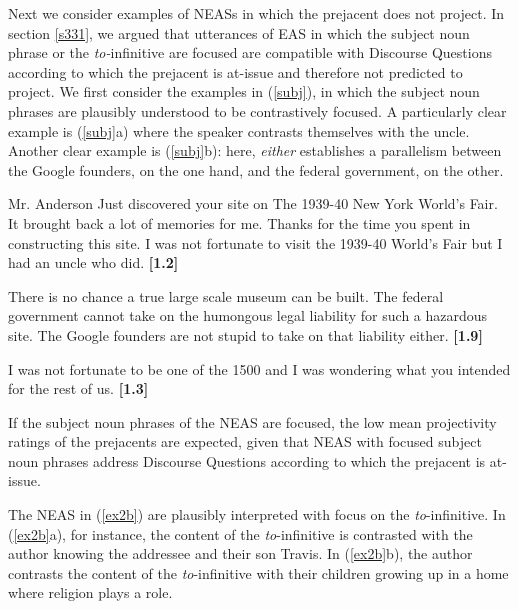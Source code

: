 \documentclass[11pt,fleqn]{article}
\newcommand{\6}{\mbox{$[\hspace*{-.6mm}[$}}
\newcommand{\9}{\mbox{$]\hspace*{-.6mm}]$}}
\begin{document}
Next we consider examples of NEASs in which the prejacent does not project. In section \ref{s331}, we argued that utterances of EAS in which the subject noun phrase or the {\em to-}infinitive are focused are compatible with Discourse Questions according to which the prejacent is at-issue and therefore not predicted to project. We first consider the examples in (\ref{subj}), in which the subject noun phrases are plausibly understood to be contrastively focused. A particularly clear example is (\ref{subj}a) where the speaker contrasts themselves with the uncle. Another clear example is (\ref{subj}b): here, {\em either} establishes a parallelism between the Google founders, on the one hand, and the federal government, on the other.


\begin{exe} 

\ex\label{subj}

\begin{xlist}

\ex Mr. Anderson Just discovered your site on
The 1939-40 New York World's Fair. It brought back a lot of memories for
me. Thanks for the time you spent in constructing this site. I was not
fortunate to visit the 1939-40 World's Fair but I had an uncle who did. \hfill {\bf [1.2]}


\ex There is no chance a true large scale museum can be built. The federal government cannot take on the humongous legal liability for such a hazardous site. The Google founders are not stupid to take on that liability either. \hfill {\bf [1.9]}

\ex I was not fortunate to be one of the 1500 and I was wondering what you intended for the rest of us. \hfill {\bf [1.3]}


\end{xlist}

\end{exe}
If the subject noun phrases of the NEAS are focused, the low mean projectivity ratings of the prejacents are expected, given that NEAS with focused subject noun phrases address Discourse Questions according to which the prejacent is at-issue.

The NEAS in (\ref{ex2b}) are plausibly interpreted with focus on the {\em to}-infinitive. In (\ref{ex2b}a), for instance, the content of the {\em to}-infinitive is contrasted with the author knowing the addressee and their son Travis. In (\ref{ex2b}b), the author contrasts the content of the {\em to}-infinitive with their children growing up in a home where religion plays a role.
\end{document}
